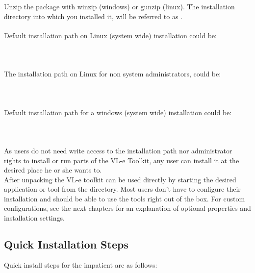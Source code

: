  Unzip the package with winzip (windows) or gunzip (linux). 
 The installation directory into which you installed it, will be referred to
 as \VLETINSTALL. \\
 \\
 Default installation path on Linux (system wide) installation could be: \\
 \\
 \tab {}\\
 \\
 The installation path on Linux for non system administrators, could be:\\ 
 \\
 \tab {}\\
 \\%
 Default installation path for a windows (system wide) installation
 could be: \\
 \\
 \tab {}\\ 
 \\	
 As users do not need write access to the installation path nor administrator
 rights to install or run parts of the VL-e Toolkit, any user can install it 
 at the desired place he or she wants to.\\
 After unpacking the VL-e toolkit can be used directly by starting the desired
 application or tool from the  directory. Most users don't have 
 to configure their installation and should be able to use the tools right out
 of the box.
 For custom configurations, see the next chapters for an explanation of
 optional properties and installation settings.\\
 
 \subsection{Quick Installation Steps}
 Quick install steps for the impatient are as follows:
 
